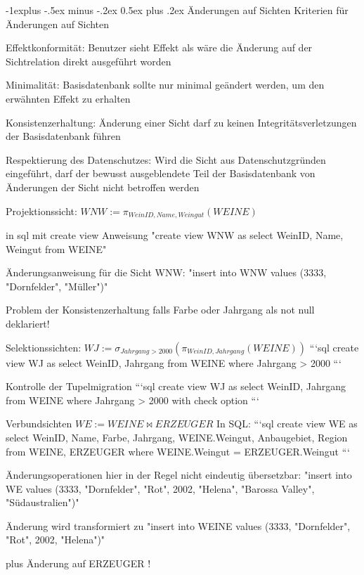 \documentclass[a4paper]{article}
\makeatletter
\renewcommand{\subsection}{\@startsection{subsection}{2}{0mm}%
                                {-1explus -.5ex minus -.2ex}%
                                {0.5ex plus .2ex}%
                                {\normalfont\normalsize\bfseries}}
\makeatother
\begin{document}
\begin{multicols}{3}
\begin{itemize*}
    \subsection{Änderungen auf Sichten}
    Kriterien für Änderungen auf Sichten
    \begin{itemize*}
        \item Effektkonformität: Benutzer sieht Effekt als wäre die Änderung auf der Sichtrelation direkt ausgeführt worden
        \item Minimalität: Basisdatenbank sollte nur minimal geändert werden, um den erwähnten Effekt zu erhalten
        \item Konsistenzerhaltung: Änderung einer Sicht darf zu keinen Integritätsverletzungen der Basisdatenbank führen
        \item Respektierung des Datenschutzes: Wird die Sicht aus Datenschutzgründen eingeführt, darf der bewusst ausgeblendete Teil der Basisdatenbank von Änderungen der Sicht nicht betroffen werden
    \end{itemize*}

    Projektionssicht: $WNW:=\pi_{WeinID, Name, Weingut}(WEINE)$
    \begin{itemize*}
        \item in sql mit create view Anweisung
        "create view WNW as select WeinID, Name, Weingut from WEINE"
        \item Änderungsanweisung für die Sicht WNW:
        "insert into WNW values (3333, "Dornfelder", "Müller")"
        \item Problem der Konsistenzerhaltung falls Farbe oder Jahrgang als not null deklariert!
    \end{itemize*}

    Selektionssichten: $WJ:=\sigma_{Jahrgang>2000}(\pi_{WeinID, Jahrgang}(WEINE))$
    ```sql
    create view WJ as
    select WeinID, Jahrgang
    from WEINE
    where Jahrgang > 2000
    ```

    Kontrolle der Tupelmigration
    ```sql
    create view WJ as
    select WeinID, Jahrgang
    from WEINE
    where Jahrgang > 2000
    with check option
    ```

    Verbundsichten $WE := WEINE \bowtie ERZEUGER$
    In SQL:
    ```sql
    create view WE as
    select WeinID, Name, Farbe, Jahrgang,
    WEINE.Weingut, Anbaugebiet, Region
    from WEINE, ERZEUGER
    where WEINE.Weingut = ERZEUGER.Weingut
    ```
    \begin{itemize*}
        \item Änderungsoperationen hier in der Regel nicht eindeutig übersetzbar:
        "insert into WE values (3333, "Dornfelder", "Rot", 2002, "Helena", "Barossa Valley", "Südaustralien")"
        \item Änderung wird transformiert zu
        "insert into WEINE values (3333, "Dornfelder", "Rot", 2002, "Helena")"
        \item plus Änderung auf ERZEUGER !
    \end{itemize*}


\end{itemize*}
\end{multicols}
\end{document}
